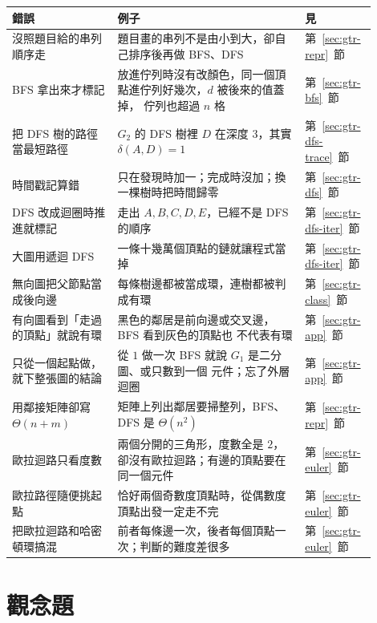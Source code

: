 \begin{center}
\small
\begin{tabular}{p{0.27\linewidth}p{0.48\linewidth}p{0.15\linewidth}}
\toprule
錯誤 & 例子 & 見 \\
\midrule
沒照題目給的串列順序走 & 題目畫的串列不是由小到大，卻自己排序後再做 BFS、DFS &
第~\ref{sec:gtr-repr}~節 \\
BFS 拿出來才標記 & 放進佇列時沒有改顏色，同一個頂點進佇列好幾次，$d$ 被後來的值蓋掉，
佇列也超過 $n$ 格 & 第~\ref{sec:gtr-bfs}~節 \\
把 DFS 樹的路徑當最短路徑 & $G_2$ 的 DFS 樹裡 $D$ 在深度 $3$，其實 $\delta(A, D) = 1$ &
第~\ref{sec:gtr-dfs-trace}~節 \\
時間戳記算錯 & 只在發現時加一；完成時沒加；換一棵樹時把時間歸零 &
第~\ref{sec:gtr-dfs}~節 \\
DFS 改成迴圈時推進就標記 & 走出 $A, B, C, D, E$，已經不是 DFS 的順序 &
第~\ref{sec:gtr-dfs-iter}~節 \\
大圖用遞迴 DFS & 一條十幾萬個頂點的鏈就讓程式當掉 & 第~\ref{sec:gtr-dfs-iter}~節 \\
無向圖把父節點當成後向邊 & 每條樹邊都被當成環，連樹都被判成有環 &
第~\ref{sec:gtr-class}~節 \\
有向圖看到「走過的頂點」就說有環 & 黑色的鄰居是前向邊或交叉邊，BFS 看到灰色的頂點也
不代表有環 & 第~\ref{sec:gtr-app}~節 \\
只從一個起點做，就下整張圖的結論 & 從 $1$ 做一次 BFS 就說 $G_1$ 是二分圖、或只數到一個
元件；忘了外層迴圈 & 第~\ref{sec:gtr-app}~節 \\
用鄰接矩陣卻寫 $\Theta(n + m)$ & 矩陣上列出鄰居要掃整列，BFS、DFS 是 $\Theta(n^2)$ &
第~\ref{sec:gtr-repr}~節 \\
歐拉迴路只看度數 & 兩個分開的三角形，度數全是 $2$，卻沒有歐拉迴路；有邊的頂點要在同一個元件 &
第~\ref{sec:gtr-euler}~節 \\
歐拉路徑隨便挑起點 & 恰好兩個奇數度頂點時，從偶數度頂點出發一定走不完 & 第~\ref{sec:gtr-euler}~節 \\
把歐拉迴路和哈密頓環搞混 & 前者每條邊一次，後者每個頂點一次；判斷的難度差很多 & 第~\ref{sec:gtr-euler}~節 \\
\bottomrule
\end{tabular}
\end{center}

\section{觀念題}
\label{sec:gtr-exercises}

